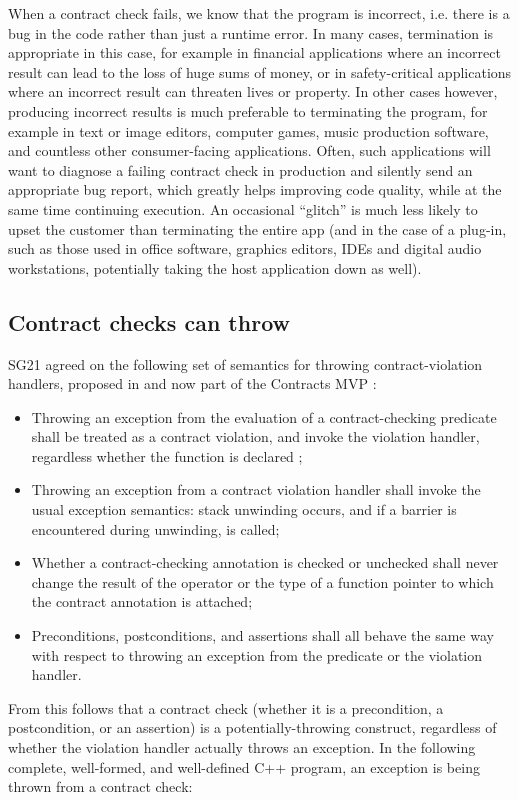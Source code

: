 When a contract check fails, we know that the program is incorrect, i.e. there is a bug in the code rather than just a runtime error. In many cases, termination is appropriate in this case, for example in financial applications where an incorrect result can lead to the loss of huge sums of money, or in safety-critical applications where an incorrect result can threaten lives or property. In other cases however, producing incorrect results is much preferable to terminating the program, for example in text or image editors, computer games, music production software, and countless other consumer-facing applications. Often, such applications will want to diagnose a failing contract check in production and silently send an appropriate bug report, which greatly helps improving code quality, while at the same time continuing execution. An occasional ``glitch'' is much less likely to upset the customer than terminating the entire app (and in the case of a plug-in, such as those used in office software, graphics editors, IDEs and digital audio workstations, potentially taking the host application down as well).

\subsection{Contract checks can throw}

SG21 agreed on the following set of semantics for throwing contract-violation handlers, proposed in \cite{P2811R7} and now part of the Contracts MVP \cite{P2900R1}:
\begin{itemize}
\item Throwing an exception from the evaluation of a contract-checking predicate shall be treated as a contract violation, and invoke the violation handler, regardless whether the function is declared ;
\item Throwing an exception from a contract violation handler shall invoke the usual exception semantics: stack unwinding occurs, and if a  barrier is encountered during unwinding,  is called;
\item Whether a contract-checking annotation is checked or unchecked shall never change the result of the  operator or the type of a function pointer to which the contract annotation is attached;
\item Preconditions, postconditions, and assertions shall all behave the same way with respect to throwing an exception from the predicate or the violation handler.
\end{itemize}
From this follows that a contract check (whether it is a precondition, a postcondition, or an assertion) is a potentially-throwing construct, regardless of whether the violation handler actually throws an exception. In the following complete, well-formed, and well-defined C++ program, an exception is being thrown from a contract check:

